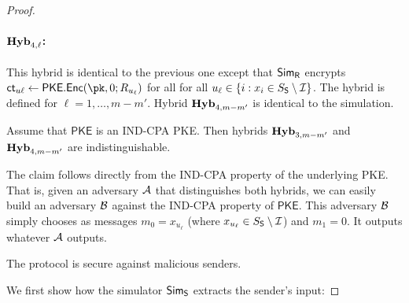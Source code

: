 \begin{proof}
\paragraph{$\mathsf{\mathbf{Hyb}}_{4,\ell}$:} This hybrid is identical to the previous one except that  $\mathsf{Sim}_{\mathsf{R}}$ encrypts $\ct_{u\ell}\leftarrow\mathsf{PKE.Enc}(\pk,0;R_{u_\ell})$ for all for all $u_\ell\in \{i:x_i\in S_{\mathsf{S}}\setminus \mathcal{I} \}$. The hybrid is defined for $\ell=1,\dots, m-m'$.  Hybrid $\mathsf{\mathbf{Hyb}}_{4,m-m'}$ is identical to the simulation.

\begin{claim}
Assume that $\mathsf{PKE}$ is an IND-CPA PKE. Then hybrids $\mathsf{\mathbf{Hyb}}_{3,m-m'}$ and $\mathsf{\mathbf{Hyb}}_{4,m-m'}$ are indistinguishable.
\end{claim}

The claim follows directly from the IND-CPA property of the underlying PKE. That is, given an adversary $\mathcal{A}$ that distinguishes both hybrids, we can easily build an adversary $\mathcal{B}$ against the IND-CPA property of $\mathsf{PKE}$. This adversary $\mathcal{B}$ simply chooses as messages $m_0=x_{u_\ell}$ (where $x_{u_\ell}\in S_{\mathsf{S}}\setminus \mathcal{I}$) and $m_1=0$. It outputs whatever $\mathcal{A}$ outputs.
 


\begin{lemma}\label{lemmma:psi-mal-sender}
The protocol is secure against malicious senders.
\end{lemma}



We first show how the simulator $\mathsf{Sim}_{\mathsf{S}}$ extracts the sender's input:


\end{proof}
